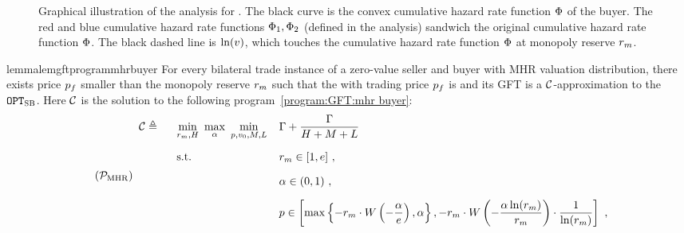 \begin{figure}
    \centering
    
    \caption{Graphical illustration of the analysis for . The black curve is the convex cumulative hazard rate function $\Phi$ of the buyer. The red and blue cumulative hazard rate functions $\Phi_1, \Phi_2$ (defined in the analysis) sandwich the original cumulative hazard rate function $\Phi$. The black dashed line is $\ln(v)$, which touches the cumulative hazard rate function $\Phi$ at monopoly reserve $r_m$.}
    \label{fig:GFT program:mhr buyer}
\end{figure}


\begin{restatable}{lemma}{lemgftprogrammhrbuyer}
\label{lem:GFT program:mhr buyer}
    For every bilateral trade instance of a zero-value seller and buyer with MHR valuation distribution, there exists price $p_f$ smaller than the monopoly reserve $r_m$ such that the {\FixPrice} with trading price $p_f$ is {\ksfair} and its GFT is a $\mathcal{C}$-approximation to the {\SecondBest} $\texttt{OPT}_{\textsc{SB}}$. Here $\mathcal{C}$ is the solution to the following program~\ref{program:GFT:mhr buyer}:
    \begin{align}
    \label{program:GFT:mhr buyer}
    \tag{$\mathcal{P}_{\mathrm{MHR}}$}
    \arraycolsep=5.4pt\def\arraystretch{1}
        \begin{array}{llll}
          \calC \triangleq~~&\min\limits_{\optreserve, H}
          ~\max\limits_{\revratio}
          ~\min\limits_{\substack{\price, \val_0, M, L}}   & 
          \displaystyle\exanteutilratio + \frac{\exanteutilratio}{H + M + L} &
          \vspace{10pt}
          \\
          \vspace{10pt}
          &\text{s.t.}
          & \optreserve\in[1, e]~,  & 
          \\
          \vspace{10pt}
          && \revratio\in(0, 1)~,  & 
          \\ 
          \vspace{10pt}
          && \displaystyle\price\in \left[\max\left\{
    -\optreserve\cdot \LambertFunc\left(-\frac{\revratio}{e}\right), \revratio\right\},
    - \optreserve\cdot \LambertFunc\left(-\displaystyle\frac{\revratio\ln(\optreserve)}{\optreserve}\right)\cdot \frac{1}{\ln(\optreserve)} \right]~,  & 
          \\

\end{array}
\end{align}
\end{restatable}
